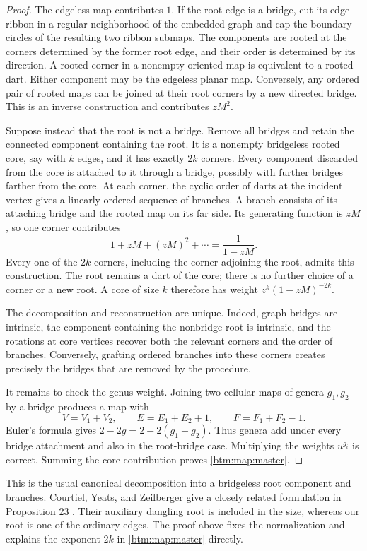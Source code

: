 \documentclass[11pt,letterpaper]{article}
\numberwithin{equation}{section}
\theoremstyle{definition}
\theoremstyle{remark}
\begin{document}
\begin{proof}
The edgeless map contributes $1$.  If the root edge is a bridge, cut its
edge ribbon in a regular neighborhood of the embedded graph and cap the
boundary circles of the resulting two ribbon submaps.  The components are rooted
at the corners determined by the former root edge, and their order is
determined by its direction.  A rooted corner in a nonempty oriented map
is equivalent to a rooted dart.  Either component may be the edgeless
planar map.  Conversely, any ordered pair of rooted maps can be joined
at their root corners by a new directed bridge.  This is an inverse
construction and contributes $zM^2$.

Suppose instead that the root is not a bridge.  Remove all bridges and
retain the connected component containing the root.  It is a nonempty
bridgeless rooted core, say with $k$ edges, and it has exactly $2k$ corners.
Every component discarded from the core is attached to it through a
bridge, possibly with further bridges farther from the core.  At each
corner, the cyclic order of darts at the incident vertex gives a linearly
ordered sequence of branches.  A branch consists of its attaching bridge
and the rooted map on its far side.  Its generating function is $zM$,
so one corner contributes
\[
 1+zM+(zM)^2+\cdots=\frac{1}{1-zM}.
\]
Every one of the $2k$ corners, including the corner adjoining the root,
admits this construction.  The root remains a dart of the core; there is
no further choice of a corner or a new root.  A core of size $k$ therefore
has weight $z^k(1-zM)^{-2k}$.

The decomposition and reconstruction are unique.  Indeed, graph bridges
are intrinsic, the component containing the nonbridge root is intrinsic,
and the rotations at core vertices recover both the relevant corners and
the order of branches.  Conversely, grafting ordered branches into these
corners creates precisely the bridges that are removed by the procedure.

It remains to check the genus weight.  Joining two cellular maps of genera
$g_1,g_2$ by a bridge produces a map with
\[
 V=V_1+V_2,\qquad E=E_1+E_2+1,\qquad F=F_1+F_2-1.
\]
Euler's formula gives $2-2g=2-2(g_1+g_2)$.  Thus genera add under every
bridge attachment and also in the root-bridge case.  Multiplying the
weights $u^{g_i}$ is correct.  Summing the core contribution proves
\eqref{btm:map:master}.
\end{proof}

This is the usual canonical decomposition into a bridgeless root component
and branches.  Courtiel, Yeats, and Zeilberger give a closely related
formulation in Proposition 23 \cite{map:cyz2019}.  Their auxiliary dangling
root is included in the size, whereas our root is one of the ordinary
edges.  The proof above fixes the normalization and explains the exponent
$2k$ in \eqref{btm:map:master} directly.
\end{document}
